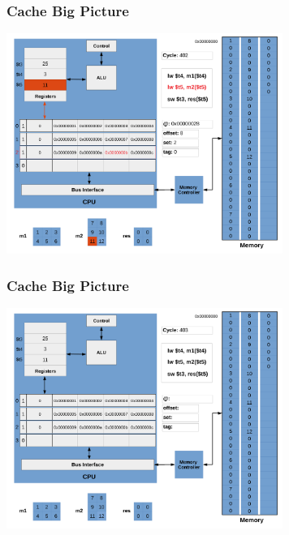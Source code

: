 \documentclass{beamer}
\begin{document}
\begin{frame}[fragile]
\frametitle{Cache Big Picture}

\begin{center}
\vspace*{-0.23cm}
\hspace*{-1cm}\includegraphics[width=9cm]{cache33.pdf}
\end{center}

\end{frame}

\begin{frame}[fragile]
\frametitle{Cache Big Picture}

\begin{center}
\vspace*{-0.23cm}
\hspace*{-1cm}\includegraphics[width=9cm]{cache34.pdf}
\end{center}

\end{frame}
\end{document}
